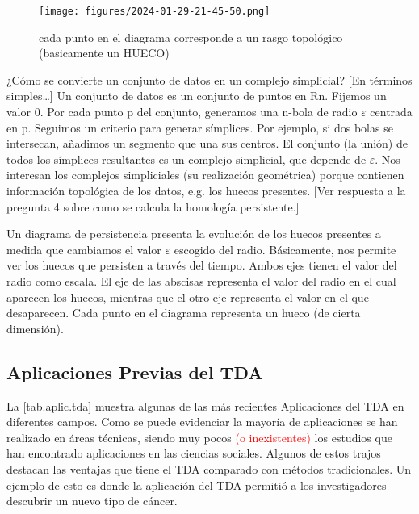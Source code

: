\documentclass[a4paper,11pt]{article}
\newcommand{\red}[1]{\textcolor{red}{#1}}
\begin{document}
\begin{figure}[!htb]
    \centering
    \texttt{[image: figures/2024-01-29-21-45-50.png]}
    \caption{cada punto en el diagrama corresponde a un rasgo topológico (basicamente un HUECO) }%
\end{figure}



¿Cómo se convierte un conjunto de datos en un complejo simplicial?
[En términos simples…] Un conjunto de datos es un conjunto de puntos en Rn. Fijemos un valor 0. Por cada punto p del conjunto, generamos una n-bola de radio \(\varepsilon\) centrada en p. Seguimos un criterio para generar símplices. Por ejemplo, si dos bolas se intersecan, añadimos un segmento que una sus centros. El conjunto (la unión) de todos los símplices resultantes es un complejo simplicial, que depende de \(\varepsilon\). Nos interesan los complejos simpliciales (su realización geométrica) porque contienen información topológica de los datos, e.g. los huecos presentes. [Ver respuesta a la pregunta 4 sobre como se calcula la homología persistente.]


Un diagrama de persistencia presenta la evolución de los huecos presentes a medida que cambiamos el valor \(\varepsilon\) escogido del radio. Básicamente, nos permite ver los huecos que persisten a través del tiempo. Ambos ejes tienen el valor del radio como escala. El eje de las abscisas representa el valor del radio en el cual aparecen los huecos, mientras que el otro eje representa el valor en el que desaparecen. Cada punto en el diagrama representa un hueco (de cierta dimensión). 



\subsection{Aplicaciones Previas del TDA}

La \autoref{tab.aplic.tda} muestra  algunas de las más recientes Aplicaciones del  TDA en diferentes campos. 
Como se puede evidenciar la mayoría de aplicaciones se han realizado en áreas técnicas, siendo muy pocos \red{(o inexistentes)} los estudios que han encontrado aplicaciones en las ciencias sociales. Algunos de estos trajos destacan las ventajas que tiene  el TDA comparado con métodos tradicionales. Un ejemplo de esto es \cite{Nicolau11} donde la aplicación del TDA permitió a los investigadores descubrir un nuevo tipo de cáncer.
\end{document}
